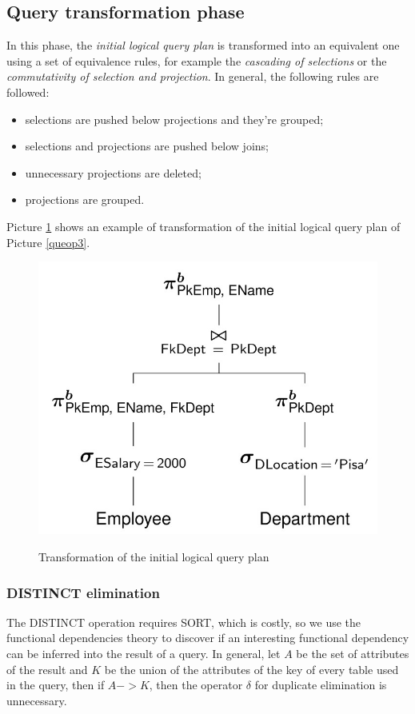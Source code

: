 \subsection{Query transformation phase}
In this phase, the \textit{initial logical query plan} is transformed into an equivalent one using a set of equivalence rules, for example the \textit{cascading of selections} or the \textit{commutativity of selection and projection}. In general, the following rules are followed:

\begin{itemize}
    \item selections are pushed below projections and they're grouped;
    \item selections and projections are pushed below joins;
    \item unnecessary projections are deleted;
    \item projections are grouped.
\end{itemize}

Picture \ref{queop4} shows an example of transformation of the initial logical query plan of Picture \ref{queop3}.

\begin{figure}[h!]
		\centering
		\includegraphics[scale = 0.9]{img/queop4.jpg}
		\label{queop4}
        \caption{Transformation of the initial logical query plan}
\end{figure}

\subsubsection{DISTINCT elimination}
The DISTINCT operation requires SORT, which is costly, so we use the functional dependencies theory to discover if an interesting functional dependency can be inferred into the result of a query. In general, let $A$ be the set of attributes of the result and $K$ be the union of the attributes of the key of every table used in the query, then if $A -> K$, then the operator $\delta$ for duplicate elimination is unnecessary.

